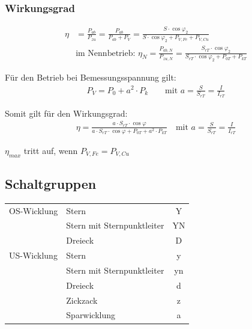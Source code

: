     \subsubsection{Wirkungsgrad}
        \begin{align*}
            \eta &= \frac{P_{ab}}{P_{zu}} = \frac{P_{ab}}{P_{ab} + P_V} = \frac{S \cdot \cos \varphi_2}{S \cdot \cos \varphi_2 + P_{V,Fe} + P_{V,Cu}} \\
            &\text{im Nennbetrieb: } \eta_N = \frac{P_{ab,N}}{P_{zu,N}} = \frac{S_{rT} \cdot \cos \varphi_2}{S_{rT} \cdot \cos \varphi_2 + P_{0T} + P_{kT}}
        \end{align*}

        Für den Betrieb bei Bemessungsspannung gilt:
        \begin{align*}
            P_V = P_0 + a^2 \cdot P_k \qquad \text{mit } a=\frac{S}{S_{rT}} = \frac{I}{I_{rT}}
        \end{align*}

        Somit gilt für den Wirkungsgrad:
        \begin{align*}
            \boxed{
                \eta = \frac{a \cdot S_{rT} \cdot \cos \varphi}{ a \cdot S_{rT} \cdot \cos \varphi + P_{0T} + a^2 \cdot P_{kT} } \quad \text{mit } a=\frac{S}{S_{rT}} = \frac{I}{I_{rT}}
            }
        \end{align*}

        \(\eta_{max}\) tritt auf, wenn \(P_{V,Fe} = P_{V,Cu}\)

\subsection{Schaltgruppen}
    \vspace{-6pt}
    \begin{table}[H]
        \begin{tabular}{l l c}
            \toprule
            OS-Wicklung & Stern                         & Y     \\
                        & Stern mit Sternpunktleiter    & YN    \\
                        & Dreieck                       & D     \\
            \midrule
            US-Wicklung & Stern                         & y     \\
                        & Stern mit Sternpunktleiter    & yn    \\
                        & Dreieck                       & d     \\
                        & Zickzack                      & z     \\
                        & Sparwicklung                  & a     \\
            \bottomrule
        \end{tabular}
    \end{table}

